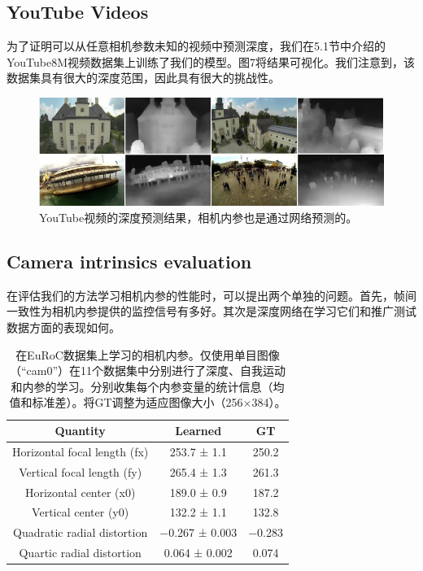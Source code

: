 \documentclass[10pt,journal,compsoc,UTF8]{IEEEtran}
\begin{document}
\subsection{YouTube Videos}
为了证明可以从任意相机参数未知的视频中预测深度，我们在5.1节中介绍的YouTube8M视频数据集上训练了我们的模型。图7将结果可视化。我们注意到，该数据集具有很大的深度范围，因此具有很大的挑战性。
\begin{figure}[htbp]
  \begin{framed}
     \centering
       \includegraphics[width=1\linewidth]{imgs/7.png} 
     \caption{YouTube视频的深度预测结果，相机内参也是通过网络预测的。}
  \end{framed}
\end{figure}
\subsection{Camera intrinsics evaluation}
在评估我们的方法学习相机内参的性能时，可以提出两个单独的问题。首先，帧间一致性为相机内参提供的监控信号有多好。其次是深度网络在学习它们和推广测试数据方面的表现如何。
\begin{table}
  \centering
  \begin{tabular}{|c|c|c|}
  \hline
  Quantity& Learned& GT\\
  \hline
  Horizontal focal length (fx)&   253.7 ± 1.1  &  250.2\\
  Vertical focal length (fy)  &   265.4 ± 1.3  &  261.3\\
  Horizontal center (x0)      &   189.0 ± 0.9  &  187.2\\
  Vertical center (y0)        &   132.2 ± 1.1  &  132.8\\
  Quadratic radial distortion &  −0.267 ± 0.003& −0.283\\
  Quartic radial distortion   &   0.064 ± 0.002&  0.074\\
  \hline
  \end{tabular}
  \caption{在EuRoC数据集上学习的相机内参。仅使用单目图像（“cam0”）在11个数据集中分别进行了深度、自我运动和内参的学习。分别收集每个内参变量的统计信息（均值和标准差）。将GT调整为适应图像大小（256×384）。}
\end{table}
\end{document}
